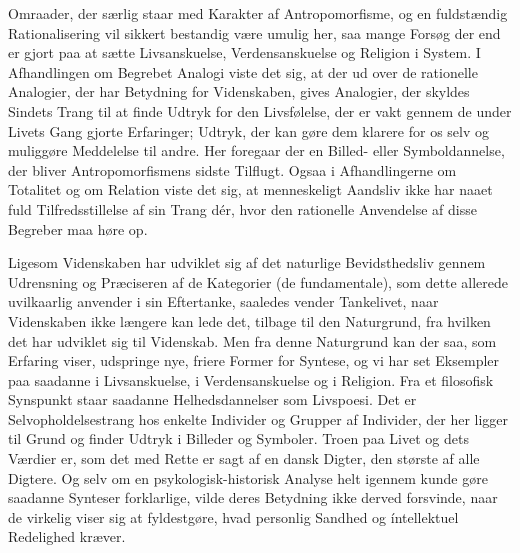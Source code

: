 \documentclass[12pt]{article}
\newcommand{\apage}[1]{\marginnote{\footnotesize\textit{[#1]}}}
\begin{document}
Omraader, der særlig staar med Karakter af Antropomorfisme, og en fuldstændig
Rationalisering vil sikkert bestandig være umulig her, saa mange Forsøg der end
er gjort paa at sætte Livsanskuelse, Verdensanskuelse og Religion i System. I
Afhandlingen om Begrebet Analogi viste det sig, at der ud over de rationelle
Analogier, der har Betydning for Videnskaben, gives Analogier, der skyldes
Sindets Trang til at finde Udtryk for den Livsfølelse, der er vakt gennem de
under Livets Gang gjorte Erfaringer; Udtryk, der kan gøre dem klarere for os
selv og muliggøre Meddelelse til andre. Her foregaar der en Billed- eller
Symboldannelse, der bliver Antropomorfismens sidste Tilflugt. Ogsaa i
Afhandlingerne om Totalitet og om Relation viste det sig, at menneskeligt
Aandsliv ikke har naaet fuld Tilfredsstillelse af sin Trang dér, hvor den
rationelle Anvendelse af disse Begreber maa høre op.

Ligesom Videnskaben har udviklet sig af det naturlige Bevidsthedsliv gennem
Udrensning og Præciseren af de
\setcounter{footnote}{0}%
\apage{118}Kategorier (de fundamentale), som dette allerede uvilkaarlig
anvender i sin Eftertanke, saaledes vender Tankelivet, naar Videnskaben ikke
længere kan lede det, tilbage til den Naturgrund, fra hvilken det har udviklet
sig til Videnskab. Men fra denne Naturgrund kan der saa, som Erfaring viser,
udspringe nye, friere Former for Syntese, og vi har set Eksempler paa saadanne
i Livsanskuelse, i Verdensanskuelse og i Religion. Fra et filosofisk Synspunkt
staar saadanne Helhedsdannelser som Livspoesi. Det er Selvopholdelsestrang hos
enkelte Individer og Grupper af Individer, der her ligger til Grund og finder
Udtryk i Billeder og Symboler. Troen paa Livet og dets Værdier er, som det med
Rette er sagt af en dansk Digter, den største af alle Digtere. Og selv om en
psykologisk-historisk Analyse helt igennem kunde gøre saadanne Synteser
forklarlige, vilde deres Betydning ikke derved forsvinde, naar de virkelig
viser sig at fyldestgøre, hvad personlig Sandhed og íntellektuel Redelighed kræver.
\end{document}
